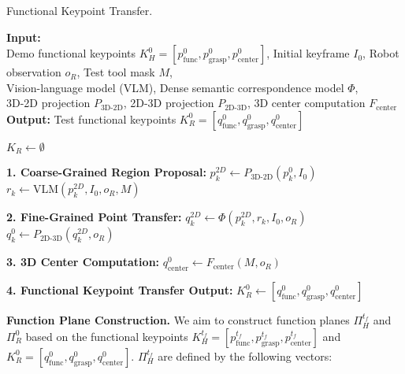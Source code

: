 \begin{algorithm}[h]
\caption{Functional Keypoint Transfer.}
\label{alg:3d_keypoint_transfer}
\textbf{Input:} \\
\hspace{1em} Demo functional keypoints \( K_H^0 = [p_{\text{func}}^0, p_{\text{grasp}}^0, p_{\text{center}}^0] \), Initial keyframe \( I_0 \), Robot observation \( o_R \), Test tool mask \( M \), \\
\hspace{1em} Vision-language model (VLM), Dense semantic correspondence model \( \Phi \), \\
\hspace{1em} 3D-2D projection \( P_{\text{3D-2D}} \), 2D-3D projection \( P_{\text{2D-3D}} \), 3D center computation \( F_{\text{center}} \) \\
\textbf{Output:} Test functional keypoints \( K_R^0 = [q_{\text{func}}^0, q_{\text{grasp}}^0, q_{\text{center}}^0] \)

\begin{algorithmic}[1]
    \State \( K_R \gets \emptyset \)

    \State \textbf{1. Coarse-Grained Region Proposal:}
        \State \( p_k^{2D} \gets P_{\text{3D-2D}}(p_k^0, I_0) \)
        \State \( r_k \gets \text{VLM}(p_k^{2D}, I_0, o_R, M) \) 
    \EndFor

    \State \textbf{2. Fine-Grained Point Transfer:}
        \State \( q_k^{2D} \gets \Phi(p_k^{2D}, r_k, I_0, o_R) \) 
        \State \( q_k^0 \gets P_{\text{2D-3D}}(q_k^{2D}, o_R) \)
    \EndFor

    \State \textbf{3. 3D Center Computation:}
    \State \( q_{\text{center}}^0 \gets F_{\text{center}}(M, o_R) \)

    \State \textbf{4. Functional Keypoint Transfer Output:}
    \State \( K_R^0 \gets [q_{\text{func}}^0, q_{\text{grasp}}^0, q_{\text{center}}^0] \)
\end{algorithmic}
\end{algorithm}

\noindent \textbf{Function Plane Construction.} We aim to construct function planes $\Pi_H^{t_f}$  and  $\Pi_R^0$  based on the functional keypoints $ K_H^{t_f} = [p_{\text{func}}^{t_f}, p_{\text{grasp}}^{t_f}, p_{\text{center}}^{t_f}]$  and  $ K_R^0 = [q_{\text{func}}^0, q_{\text{grasp}}^0, q_{\text{center}}^0]$. $\Pi_H^{t_f}$ are defined by the following vectors:


